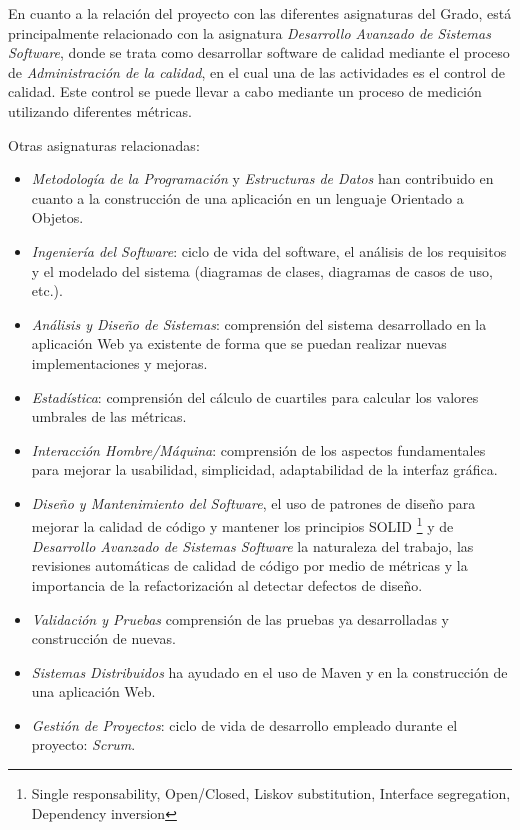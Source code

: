 En cuanto a la relación del proyecto con las diferentes asignaturas del Grado, está principalmente relacionado con la asignatura \textit{Desarrollo Avanzado de Sistemas Software}, donde se trata como desarrollar software de calidad mediante el proceso de \textit{Administración de la calidad}, en el cual una de las actividades es el control de calidad. Este control se puede llevar a cabo mediante un proceso de medición utilizando diferentes métricas.


Otras asignaturas relacionadas: 
\begin{itemize}
	\tightlist
	\item \textit{Metodología de la Programación} y \textit{Estructuras de Datos} han contribuido en cuanto a la construcción de una aplicación en un lenguaje Orientado a Objetos.	
		\item \textit{Ingeniería del Software}: ciclo de vida del software, el análisis de los requisitos y el modelado del sistema (diagramas de clases, diagramas de casos de uso, etc.).
		\item \textit{Análisis y Diseño de Sistemas}: comprensión del sistema desarrollado en la aplicación Web ya existente \cite{TFGPrevio} de forma que se puedan realizar nuevas implementaciones y mejoras.
	\item \textit{Estadística}: comprensión del cálculo de cuartiles para calcular los valores umbrales de las métricas.
	\item \textit{Interacción Hombre/Máquina}: comprensión de los aspectos fundamentales para mejorar la usabilidad, simplicidad, adaptabilidad de la interfaz gráfica.
	\item \textit{Diseño y Mantenimiento del Software}, el uso de patrones de diseño para mejorar la calidad de código y mantener los principios SOLID  \footnote{Single responsability, Open/Closed, Liskov substitution, Interface segregation, Dependency inversion} y de \textit{Desarrollo Avanzado de Sistemas Software} la naturaleza del trabajo, las revisiones automáticas de calidad de código por medio de métricas y la importancia de la refactorización al detectar defectos de diseño.
	\item \textit{Validación y Pruebas} comprensión de las pruebas ya desarrolladas y construcción de nuevas.
	\item \textit{Sistemas Distribuidos} ha ayudado en el uso de Maven y en la construcción de una aplicación Web.
	\item \textit{Gestión de Proyectos}: ciclo de vida de desarrollo empleado durante el proyecto: \textit{Scrum}\cite{scrum_master_scrum_2019}.
\end{itemize}

